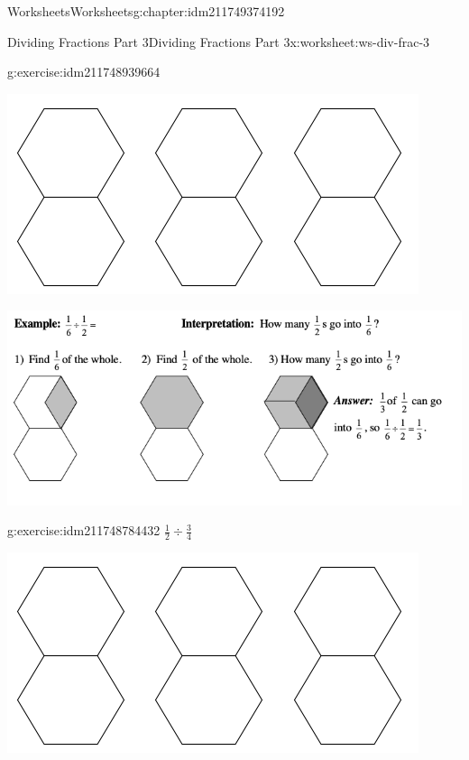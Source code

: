 \documentclass[twoside,11pt,]{book}
\begin{document}
\begin{chapterptx}{Worksheets}{}{Worksheets}{}{}{g:chapter:idm211749374192}
\begin{worksheet-section-numberless}{Dividing Fractions Part 3}{}{Dividing Fractions Part 3}{}{}{x:worksheet:ws-div-frac-3}
\begin{divisionexercise}{1}{}{}{g:exercise:idm211748939664}
\begin{sidebyside}{1}{0.15}{0.15}{0}
\begin{sbspanel}{0.7}
\includegraphics[width=1\linewidth]{images/3-double-hexagons.png}
\end{sbspanel}%
\end{sidebyside}%
\end{divisionexercise}%
\clearpage
\begin{introduction}{}%
\begin{sidebyside}{1}{0}{0}{0}%
\begin{sbspanel}{1}%
\includegraphics[width=1\linewidth]{images/frac-div-hex-2.png}
\end{sbspanel}%
\end{sidebyside}%
\end{introduction}%
\begin{divisionexercise}{2}{}{}{g:exercise:idm211748784432}%
\(\frac{1}{2} \div \frac{3}{4} \)%
\begin{sidebyside}{1}{0.15}{0.15}{0}%
\begin{sbspanel}{0.7}%
\includegraphics[width=1\linewidth]{images/3-double-hexagons.png}

\end{sbspanel}
\end{sidebyside}
\end{divisionexercise}
\end{worksheet-section-numberless}
\end{chapterptx}
\end{document}
